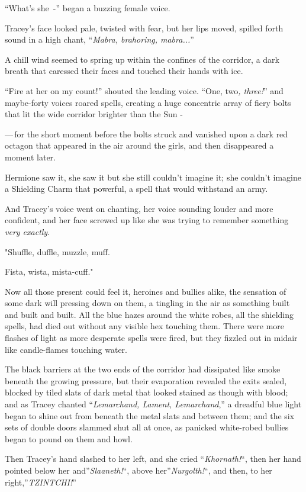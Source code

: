 ``What's she~-'' began a buzzing female voice.

Tracey's face looked pale, twisted with fear, but her lips moved, spilled forth sound in a high chant, ``\emph{Mabra, brahoring, mabra...}''

A chill wind seemed to spring up within the confines of the corridor, a dark breath that caressed their faces and touched their hands with ice.

``Fire at her on my count!'' shouted the leading voice. ``One, two\emph{, three!}'' and maybe-forty voices roared spells, creating a huge concentric array of fiery bolts that lit the wide corridor brighter than the Sun -

---\,for the short moment before the bolts struck and vanished upon a dark red octagon that appeared in the air around the girls, and then disappeared a moment later.

Hermione saw it, she saw it but she still couldn't imagine it; she couldn't imagine a Shielding Charm that powerful, a spell that would withstand an army.

And Tracey's voice went on chanting, her voice sounding louder and more confident, and her face screwed up like she was trying to remember something \emph{very exactly}.

"Shuffle, duffle, muzzle, muff.

Fista, wista, mista-cuff."

Now all those present could feel it, heroines and bullies alike, the sensation of some dark will pressing down on them, a tingling in the air as something built and built and built. All the blue hazes around the white robes, all the shielding spells, had died out without any visible hex touching them. There were more flashes of light as more desperate spells were fired, but they fizzled out in midair like candle-flames touching water.

The black barriers at the two ends of the corridor had dissipated like smoke beneath the growing pressure, but their evaporation revealed the exits sealed, blocked by tiled slats of dark metal that looked stained as though with blood; and as Tracey chanted ``\emph{Lemarchand, Lament, Lemarchand},'' a dreadful blue light began to shine out from beneath the metal slats and between them; and the six sets of double doors slammed shut all at once, as panicked white-robed bullies began to pound on them and howl.

Then Tracey's hand slashed to her left, and she cried ``\emph{Khornath!}``, then her hand pointed below her and''\emph{Slaaneth!}``, above her''\emph{Nurgolth!}``, and then, to her right,''\emph{TZINTCHI!}''

